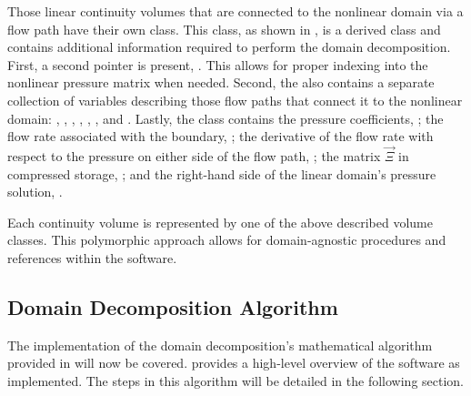 Those linear continuity volumes that are connected to the nonlinear domain via a flow path have their own  class.
This class, as shown in , is a derived class and contains additional information required to perform the domain decomposition.
First, a second  pointer is present, .
This allows for proper indexing into the nonlinear pressure matrix when needed.
Second, the  also contains a separate collection of variables describing those flow paths that connect it to the nonlinear domain: , , , , , , and .
Lastly, the  class contains the pressure coefficients, ; the flow rate associated with the boundary, ; the derivative of the flow rate with respect to the pressure on either side of the flow path, ; the matrix $\vec{\Xi}$ in compressed storage, ; and the right-hand side of the linear domain's pressure solution, .

Each continuity volume is represented by one of the above described volume classes.
This polymorphic approach allows for domain-agnostic procedures and references within the software.

\subsection{Domain Decomposition Algorithm}
\label{subsect:domDecompAlgorithm}

The implementation of the domain decomposition's mathematical algorithm provided in  will now be covered.
 provides a high-level overview of the software as implemented.
The steps in this algorithm will be detailed in the following section.

